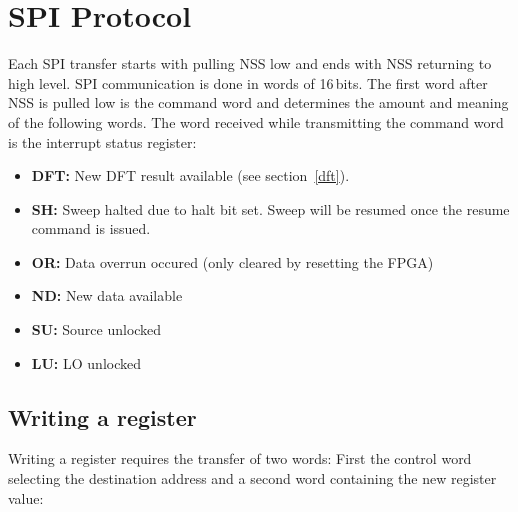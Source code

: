 \documentclass{article}
\newcommand{\bitrect}[2]{
  \begin{pgfonlayer}{foreground}
    \draw [thick] (0,0) rectangle (#1,1);
    \pgfmathsetmacro\result{#1-1}
    \foreach \x in {1,...,\result}
      \draw [thick] (\x,1) -- (\x, 0.8);
  \end{pgfonlayer}
  \bitlabels{#1}{#2}
}
\newcommand{\rwbits}[3]{
  \draw [thick] (#1,0) rectangle ++(#2,1) node[pos=0.5]{#3};
  \pgfmathsetmacro\start{#1+0.5}
  \pgfmathsetmacro\finish{#1+#2-0.5}
}
\newcommand{\robits}[3]{
  \begin{pgfonlayer}{background}
    \draw [thick, fill=lightgray] (#1,0) rectangle ++(#2,1) node[pos=0.5]{#3};
  \end{pgfonlayer}
  \pgfmathsetmacro\start{#1+0.5}
  \pgfmathsetmacro\finish{#1+#2-0.5}
}
\newcommand{\bitlabels}[2]{
  \foreach \bit in {1,...,#1}{
     \pgfmathsetmacro\result{#2}
     \node [above] at (\bit-0.5, 1) {\pgfmathprintnumber{\result}};
   }
}
\begin{document}
\section{SPI Protocol}
Each SPI transfer starts with pulling NSS low and ends with NSS returning to high level. SPI communication is done in words of 16\,bits. The first word after NSS is pulled low is the command word and determines the amount and meaning of the following words.
The word received while transmitting the command word is the interrupt status register:
\begin{center}
\end{center}
\begin{itemize}
\item \textbf{DFT:} New DFT result available (see section~\ref{dft}).
\item \textbf{SH:} Sweep halted due to halt bit set. Sweep will be resumed once the resume command is issued.
\item \textbf{OR:} Data overrun occured (only cleared by resetting the FPGA)
\item \textbf{ND:} New data available
\item \textbf{SU:} Source unlocked
\item \textbf{LU:} LO unlocked
\end{itemize}
\subsection{Writing a register}
Writing a register requires the transfer of two words: First the control word selecting the destination address and a second word containing the new register value:
\begin{center}
\end{center}
\end{document}
